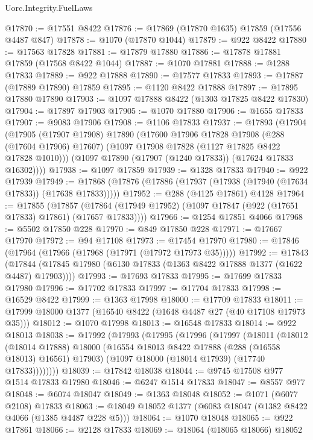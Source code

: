 \begin{lexlean}{Uorc.Integrity.FuelLaws}
\begin{coremodule}
@17870 := @17551 @8422
@17876 := @17869 (@17870 @1635) @17859 (@17556 @4487 @847)
@17878 := @1070 (@17870 @1044)
@17879 := @922 @8422
@17880 := @17563 @17828
@17881 := @17879 @17880
@17886 := @17878 @17881 @17859 (@17568 @8422 @1044)
@17887 := @1070 @17881
@17888 := @1288 @17833
@17889 := @922 @17888
@17890 := @17577 @17833
@17893 := @17887 (@17889 @17890) @17859
@17895 := @1120 @8422 @17888
@17897 := @17895 @17880 @17890
@17903 := @1097 @17888 @8422 (@1303 @17825 @8422 @17830)
@17904 := @17897 @17903
@17905 := @1070 @17880
@17906 := @1655 @17833
@17907 := @9083 @17906
@17908 := @1106 @17833
@17937 := @17893
    (@17904
      (@17905
        (@17907 @17908)
        @17890
        (@17600
          @17906
          @17828
          @17908
          (@288 (@17604 @17906) @17607)
          (@1097 @17908 @17828 (@1127 @17825 @8422 @17828 @1010)))
        (@1097 @17890 (@17907 (@1240 @17833)) (@17624 @17833 @16302))))
@17938 := @1097 @17859
@17939 := @1328 @17833
@17940 := @922 @17939
@17949 := @17868 (@17876 (@17886 (@17937 (@17938 (@17940 (@17634 @17833)) (@17638 @17833)))))
@17952 := @288 (@4125 @17861) @4128
@17964 := @17855
    (@17857 (@17864 (@17949 @17952) (@1097 @17847 (@922 (@17651 @17833) @17861) (@17657 @17833))))
@17966 := @1254 @17851 @4066
@17968 := @5502 @17850 @228
@17970 := @849 @17850 @228
@17971 := @17667 @17970
@17972 := @94 @17108
@17973 := @17454 @17970
@17980 := @17846 (@17964 (@17966 (@17968 (@17971 (@17972 @17973 @35)))))
@17992 := @17843
    (@17844 (@17845 @17980 (@6130 @17833 (@1363 @8422 @17888 @1377 (@1622 @4487) @17903))))
@17993 := @17693 @17833
@17995 := @17699 @17833 @17980
@17996 := @17702 @17833
@17997 := @17704 @17833
@17998 := @16529 @8422
@17999 := @1363 @17998
@18000 := @17709 @17833
@18011 := @17999 @18000 @1377 (@16540 @8422 (@1648 @4487 @27 (@40 @17108 @17973 @35)))
@18012 := @1070 @17998
@18013 := @16548 @17833
@18014 := @922 @18013
@18038 := @17992
    (@17993
      (@17995
        (@17996
          (@17997
            (@18011
              (@18012
                (@18014 @17888)
                @18000
                (@16554 @18013 @8422 @17888 (@288 (@16558 @18013) @16561) @17903)
                (@1097 @18000 (@18014 @17939) (@17740 @17833))))))))
@18039 := @17842 @18038
@18044 := @9745 @17508 @977 @1514 @17833 @17980
@18046 := @6247 @1514 @17833
@18047 := @8557 @977
@18048 := @6074 @18047
@18049 := @1363 @18048
@18052 := @1071 (@6077 @2108) @17833
@18063 := @18049 @18052 @1377 (@6083 @18047 (@1382 @8422 @4066 (@1385 @4487 @228 @5)))
@18064 := @1070 @18048
@18065 := @922 @17861
@18066 := @2128 @17833
@18069 := @18064 (@18065 @18066) @18052

\end{coremodule}
\end{lexlean}
